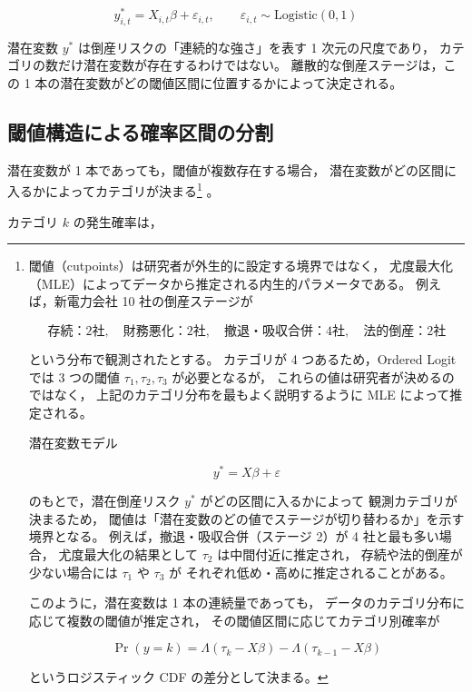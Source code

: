 \[
y^*_{i,t} = X_{i,t}\beta + \varepsilon_{i,t},
\qquad
\varepsilon_{i,t} \sim \text{Logistic}(0,1)
\]



潜在変数 $y^*$ は倒産リスクの「連続的な強さ」を表す 1 次元の尺度であり，
カテゴリの数だけ潜在変数が存在するわけではない。
離散的な倒産ステージは，この 1 本の潜在変数がどの閾値区間に位置するかによって決定される。


\subsection{閾値構造による確率区間の分割}

潜在変数が 1 本であっても，閾値が複数存在する場合，
潜在変数がどの区間に入るかによってカテゴリが決まる\footnote{
閾値（cutpoints）は研究者が外生的に設定する境界ではなく，
尤度最大化（MLE）によってデータから推定される内生的パラメータである。
例えば，新電力会社 10 社の倒産ステージが


\[
\text{存続：2社},\quad
\text{財務悪化：2社},\quad
\text{撤退・吸収合併：4社},\quad
\text{法的倒産：2社}
\]


という分布で観測されたとする。
カテゴリが 4 つあるため，Ordered Logit では 3 つの閾値
\(\tau_1,\tau_2,\tau_3\) が必要となるが，
これらの値は研究者が決めるのではなく，
上記のカテゴリ分布を最もよく説明するように MLE によって推定される。

潜在変数モデル


\[
y^* = X\beta + \varepsilon
\]


のもとで，潜在倒産リスク \(y^*\) がどの区間に入るかによって
観測カテゴリが決まるため，
閾値は「潜在変数のどの値でステージが切り替わるか」を示す境界となる。
例えば，撤退・吸収合併（ステージ 2）が 4 社と最も多い場合，
尤度最大化の結果として \(\tau_2\) は中間付近に推定され，
存続や法的倒産が少ない場合には \(\tau_1\) や \(\tau_3\) が
それぞれ低め・高めに推定されることがある。

このように，潜在変数は 1 本の連続量であっても，
データのカテゴリ分布に応じて複数の閾値が推定され，
その閾値区間に応じてカテゴリ別確率が


\[
\Pr(y=k)
=
\Lambda(\tau_k - X\beta)
-
\Lambda(\tau_{k-1} - X\beta)
\]


というロジスティック CDF の差分として決まる。
}
。

カテゴリ $k$ の発生確率は，



